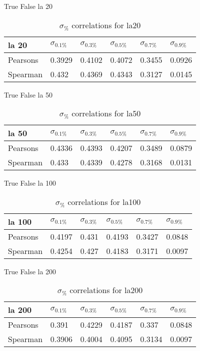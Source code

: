 \documentclass{sig-alternate}
\begin{document}
True False la 20
\begin{table}[h!]
\centering
\caption{$\sigma_{\%}$ correlations for la20}
\begin{tabular}{|l|l|l|l|l|l|}
\hline
la 20 & $\sigma_{0.1\%}$ & $\sigma_{0.3\%}$ & $\sigma_{0.5\%}$ & $\sigma_{0.7\%}$ & $\sigma_{0.9\%}$ \\ \hline
Pearsons  & 0.3929 & 0.4102 & 0.4072 & 0.3455 & 0.0926 \\ \hline
Spearman  & 0.432 & 0.4369 & 0.4343 & 0.3127 & 0.0145 \\ \hline
\end{tabular}
\end{table}
True False la 50
\begin{table}[h!]
\centering
\caption{$\sigma_{\%}$ correlations for la50}
\begin{tabular}{|l|l|l|l|l|l|}
\hline
la 50 & $\sigma_{0.1\%}$ & $\sigma_{0.3\%}$ & $\sigma_{0.5\%}$ & $\sigma_{0.7\%}$ & $\sigma_{0.9\%}$ \\ \hline
Pearsons  & 0.4336 & 0.4393 & 0.4207 & 0.3489 & 0.0879 \\ \hline
Spearman  & 0.433 & 0.4339 & 0.4278 & 0.3168 & 0.0131 \\ \hline
\end{tabular}
\end{table}
True False la 100
\begin{table}[h!]
\centering
\caption{$\sigma_{\%}$ correlations for la100}
\begin{tabular}{|l|l|l|l|l|l|}
\hline
la 100 & $\sigma_{0.1\%}$ & $\sigma_{0.3\%}$ & $\sigma_{0.5\%}$ & $\sigma_{0.7\%}$ & $\sigma_{0.9\%}$ \\ \hline
Pearsons  & 0.4197 & 0.431 & 0.4193 & 0.3427 & 0.0848 \\ \hline
Spearman  & 0.4254 & 0.427 & 0.4183 & 0.3171 & 0.0097 \\ \hline
\end{tabular}
\end{table}
True False la 200
\begin{table}[h!]
\centering
\caption{$\sigma_{\%}$ correlations for la200}
\begin{tabular}{|l|l|l|l|l|l|}
\hline
la 200 & $\sigma_{0.1\%}$ & $\sigma_{0.3\%}$ & $\sigma_{0.5\%}$ & $\sigma_{0.7\%}$ & $\sigma_{0.9\%}$ \\ \hline
Pearsons  & 0.391 & 0.4229 & 0.4187 & 0.337 & 0.0848 \\ \hline
Spearman  & 0.3906 & 0.4004 & 0.4095 & 0.3134 & 0.0097 \\ \hline
\end{tabular}
\end{table}
\end{document}
